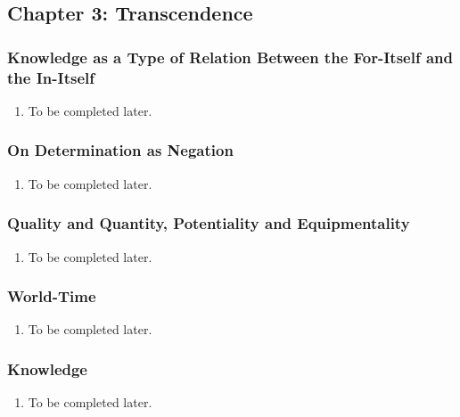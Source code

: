 \subsection{Chapter 3: Transcendence}

\subsubsection{Knowledge as a Type of Relation Between the For-Itself and the In-Itself}

\begin{enumerate}
  \item To be completed later.
\end{enumerate}

\subsubsection{On Determination as Negation}

\begin{enumerate}
  \item To be completed later.
\end{enumerate}

\subsubsection{Quality and Quantity, Potentiality and Equipmentality}

\begin{enumerate}
  \item To be completed later.
\end{enumerate}

\subsubsection{World-Time}

\begin{enumerate}
  \item To be completed later.
\end{enumerate}

\subsubsection{Knowledge}

\begin{enumerate}
  \item To be completed later.
\end{enumerate}
